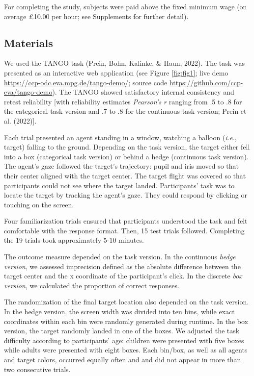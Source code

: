 \documentclass[
  man,floatsintext]{apa6}
\begin{document}
For completing the study, subjects were paid above the fixed minimum wage (on average £10.00 per hour; see Supplements for further detail).

\hypertarget{materials}{%
\subsection{Materials}\label{materials}}

We used the TANGO task (Prein, Bohn, Kalinke, \& Haun, 2022).
The task was presented as an interactive web application (see Figure \ref{fig:fig1}; live demo \href{https://ccp-odc.eva.mpg.de/tango-demo/.}{https://ccp-odc.eva.mpg.de/tango-demo/}; source code \url{https://github.com/ccp-eva/tango-demo}).
The TANGO showed satisfactory internal consistency and retest reliability {[}with reliability estimates \emph{Pearson's r} ranging from .5 to .8 for the categorical task version and .7 to .8 for the continuous task version; Prein et al. (2022){]}.

Each trial presented an agent standing in a window, watching a balloon (\emph{i.e.}, target) falling to the ground.
Depending on the task version, the target either fell into a box (categorical task version) or behind a hedge (continuous task version).
The agent's gaze followed the target's trajectory: pupil and iris moved so that their center aligned with the target center.
The target flight was covered so that participants could not see where the target landed.
Participants' task was to locate the target by tracking the agent's gaze.
They could respond by clicking or touching on the screen.

Four familiarization trials ensured that participants understood the task and felt comfortable with the response format.
Then, 15 test trials followed.
Completing the 19 trials took approximately 5-10 minutes.

The outcome measure depended on the task version.
In the continuous \emph{hedge version}, we assessed imprecision defined as the absolute difference between the target center and the x coordinate of the participant's click.
In the discrete \emph{box version}, we calculated the proportion of correct responses.

The randomization of the final target location also depended on the task version.
In the hedge version, the screen width was divided into ten bins, while exact coordinates within each bin were randomly generated during runtime.
In the box version, the target randomly landed in one of the boxes.
We adjusted the task difficulty according to participants' age: children were presented with five boxes while adults were presented with eight boxes.
Each bin/box, as well as all agents and target colors, occurred equally often and and did not appear in more than two consecutive trials.
\end{document}
